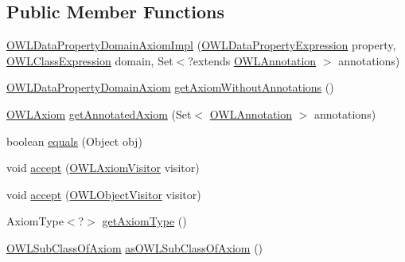 \subsection*{Public Member Functions}
\begin{DoxyCompactItemize}
\item 
\hyperlink{classuk_1_1ac_1_1manchester_1_1cs_1_1owl_1_1owlapi_1_1_o_w_l_data_property_domain_axiom_impl_a49a5613c04d04f062eb9f680751bdefd}{O\-W\-L\-Data\-Property\-Domain\-Axiom\-Impl} (\hyperlink{interfaceorg_1_1semanticweb_1_1owlapi_1_1model_1_1_o_w_l_data_property_expression}{O\-W\-L\-Data\-Property\-Expression} property, \hyperlink{interfaceorg_1_1semanticweb_1_1owlapi_1_1model_1_1_o_w_l_class_expression}{O\-W\-L\-Class\-Expression} domain, Set$<$?extends \hyperlink{interfaceorg_1_1semanticweb_1_1owlapi_1_1model_1_1_o_w_l_annotation}{O\-W\-L\-Annotation} $>$ annotations)
\item 
\hyperlink{interfaceorg_1_1semanticweb_1_1owlapi_1_1model_1_1_o_w_l_data_property_domain_axiom}{O\-W\-L\-Data\-Property\-Domain\-Axiom} \hyperlink{classuk_1_1ac_1_1manchester_1_1cs_1_1owl_1_1owlapi_1_1_o_w_l_data_property_domain_axiom_impl_ae9d3007f6f1a5657a146d969d25808c7}{get\-Axiom\-Without\-Annotations} ()
\item 
\hyperlink{interfaceorg_1_1semanticweb_1_1owlapi_1_1model_1_1_o_w_l_axiom}{O\-W\-L\-Axiom} \hyperlink{classuk_1_1ac_1_1manchester_1_1cs_1_1owl_1_1owlapi_1_1_o_w_l_data_property_domain_axiom_impl_ac87f2dd24e5c3e379540aa7007a76c6c}{get\-Annotated\-Axiom} (Set$<$ \hyperlink{interfaceorg_1_1semanticweb_1_1owlapi_1_1model_1_1_o_w_l_annotation}{O\-W\-L\-Annotation} $>$ annotations)
\item 
boolean \hyperlink{classuk_1_1ac_1_1manchester_1_1cs_1_1owl_1_1owlapi_1_1_o_w_l_data_property_domain_axiom_impl_aa44baf8145482261611d51f043dbb1b5}{equals} (Object obj)
\item 
void \hyperlink{classuk_1_1ac_1_1manchester_1_1cs_1_1owl_1_1owlapi_1_1_o_w_l_data_property_domain_axiom_impl_a4270c7aea8db41bd4dce3be23789db60}{accept} (\hyperlink{interfaceorg_1_1semanticweb_1_1owlapi_1_1model_1_1_o_w_l_axiom_visitor}{O\-W\-L\-Axiom\-Visitor} visitor)
\item 
void \hyperlink{classuk_1_1ac_1_1manchester_1_1cs_1_1owl_1_1owlapi_1_1_o_w_l_data_property_domain_axiom_impl_a25f489e1acc58446300985f2c5baf049}{accept} (\hyperlink{interfaceorg_1_1semanticweb_1_1owlapi_1_1model_1_1_o_w_l_object_visitor}{O\-W\-L\-Object\-Visitor} visitor)
\item 
Axiom\-Type$<$?$>$ \hyperlink{classuk_1_1ac_1_1manchester_1_1cs_1_1owl_1_1owlapi_1_1_o_w_l_data_property_domain_axiom_impl_a11e1a9f1f6422f5d59529cc1887a636b}{get\-Axiom\-Type} ()
\item 
\hyperlink{interfaceorg_1_1semanticweb_1_1owlapi_1_1model_1_1_o_w_l_sub_class_of_axiom}{O\-W\-L\-Sub\-Class\-Of\-Axiom} \hyperlink{classuk_1_1ac_1_1manchester_1_1cs_1_1owl_1_1owlapi_1_1_o_w_l_data_property_domain_axiom_impl_a84853fcb78aa898db2c8d531d7392c14}{as\-O\-W\-L\-Sub\-Class\-Of\-Axiom} ()
\end{DoxyCompactItemize}
